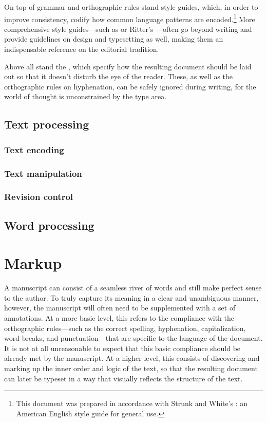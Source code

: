 \documentclass{book}
\begin{document}
On top of grammar and orthographic rules stand style guides, which, in order to
improve consistency, codify how common language patterns are encoded.\footnote{%
  This document was prepared in accordance with Strunk and White's
  : an American English style guide for general use.
} More comprehensive style guides---such as 
or Ritter's ---often go beyond writing and provide
guidelines on design and typesetting as well, making them an indispensable
reference on the editorial tradition.

Above all stand the , which specify how the resulting
document should be laid out so that it doesn't disturb the eye of the reader.
These, as well as the orthographic rules on hyphenation, can be safely ignored
during writing, for the world of thought is unconstrained by the type area.


\section{Text processing}
\subsection{Text encoding}
\subsection{Text manipulation}
\subsection{Revision control}
\section{Word processing}

\chapter{Markup}
A manuscript can consist of a seamless river of words and still make perfect
sense to the author. To truly capture its meaning in a clear and unambiguous
manner, however, the manuscript will often need to be supplemented with a set of
annotations. At a more basic level, this refers to the compliance with the
orthographic rules---such as the correct spelling, hyphenation, capitalization,
word breaks, and punctuation---that are specific to the language of the document.
It is not at all unreasonable to expect that this basic compliance should be
already met by the manuscript. At a higher level, this consists of discovering
and marking up the inner order and logic of the text, so that the resulting
document can later be typeset in a way that visually reflects the structure of
the text.
\end{document}
